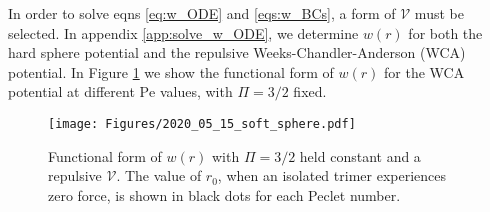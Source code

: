\documentclass[twocolumn,amsmath,amssymb,aps]{revtex4-1}%
\begin{document}
In order to solve eqns \ref{eq:w_ODE} and \ref{eqs:w_BCs}, a form of
$\mathcal{V}$ must be selected. In appendix \ref{app:solve_w_ODE},
we determine $w(r)$ for both the hard sphere potential and the repulsive
Weeks-Chandler-Anderson (WCA) potential. In Figure \ref{fig:1} we
show the functional form of $w(r)$ for the WCA potential at different
$\mathrm{Pe}$ values, with $\Pi=3/2$ fixed.

\begin{figure}[t!]
  \texttt{[image: Figures/2020\_05\_15\_soft\_sphere.pdf]}
  \caption{Functional form of $w(r)$ with $\Pi=3/2$ held constant and
    a repulsive $\mathcal{V}$. The value of $r_0$,
    when an isolated trimer experiences zero force, is shown in black dots
    for each Peclet number.
  }\label{fig:1}
\end{figure}
\end{document}
